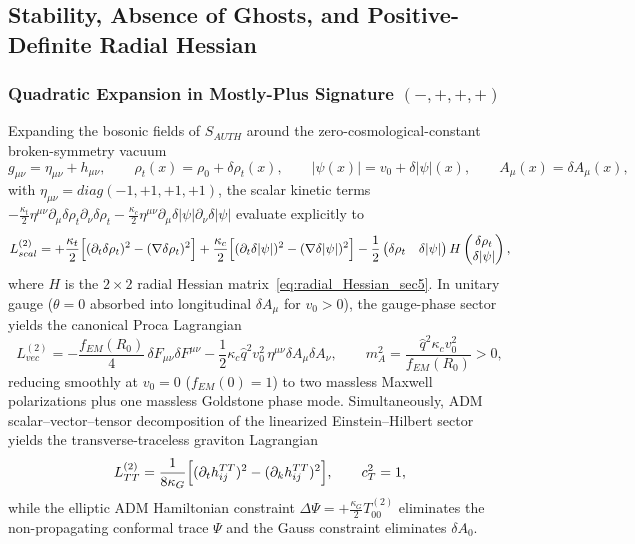 \documentclass[american,11pt,letterpaper]{article}
\def\mathcal#1{#1}%
\def\mathrm#1{#1}%
\begin{document}
\subsection{Stability, Absence of Ghosts, and Positive-Definite Radial Hessian}

\subsubsection{Quadratic Expansion in Mostly-Plus Signature $(-,+,+,+)$}

Expanding the bosonic fields of $S_{\mathrm{AUTH}}$ around the zero-cosmological-constant broken-symmetry vacuum
\[
g_{\mu\nu} = \eta_{\mu\nu} + h_{\mu\nu}, \qquad
\rho_t(x) = \rho_0 + \delta\rho_t(x), \qquad
|\psi(x)| = v_0 + \delta|\psi|(x), \qquad
A_\mu(x) = \delta A_\mu(x),
\]
with $\eta_{\mu\nu} = \mathrm{diag}(-1,+1,+1,+1)$, the scalar kinetic terms $-\frac{\kappa_t}{2}\eta^{\mu\nu}\partial_\mu\delta\rho_t\partial_\nu\delta\rho_t - \frac{\kappa_c}{2}\eta^{\mu\nu}\partial_\mu\delta|\psi|\partial_\nu\delta|\psi|$ evaluate explicitly to
\begin{equation}
\mathcal{L}_{\mathrm{scal}}^{(2)}
= +\frac{\kappa_t}{2}\Bigl[(\partial_t\delta\rho_t)^2 - (\nabla\delta\rho_t)^2\Bigr]
  + \frac{\kappa_c}{2}\Bigl[(\partial_t\delta|\psi|)^2 - (\nabla\delta|\psi|)^2\Bigr]
  - \frac{1}{2}
  \begin{pmatrix}\delta\rho_t & \delta|\psi|\end{pmatrix}
  H
  \begin{pmatrix}\delta\rho_t \\ \delta|\psi|\end{pmatrix},
\label{eq:quadratic_scalar_lagrangian_sec19}
\end{equation}
where $H$ is the $2\times 2$ radial Hessian matrix~\eqref{eq:radial_Hessian_sec5}. In unitary gauge ($\theta = 0$ absorbed into longitudinal $\delta A_\mu$ for $v_0 > 0$), the gauge-phase sector yields the canonical Proca Lagrangian
\begin{equation}
\mathcal{L}_{\mathrm{vec}}^{(2)}
= -\frac{f_{\mathrm{EM}}(R_0)}{4}\,\delta F_{\mu\nu}\delta F^{\mu\nu}
  - \frac{1}{2}\kappa_c\hat{q}^2 v_0^2\,\eta^{\mu\nu}\delta A_\mu\delta A_\nu,
\qquad
m_A^2 = \frac{\hat{q}^2\kappa_c v_0^2}{f_{\mathrm{EM}}(R_0)} > 0,
\label{eq:proca_mass_sec19}
\end{equation}
reducing smoothly at $v_0 = 0$ ($f_{\mathrm{EM}}(0)=1$) to two massless Maxwell polarizations plus one massless Goldstone phase mode. Simultaneously, ADM scalar--vector--tensor decomposition of the linearized Einstein--Hilbert sector yields the transverse-traceless graviton Lagrangian
\begin{equation}
\mathcal{L}_{\mathrm{TT}}^{(2)}
= \frac{1}{8\kappa_G}\Bigl[(\partial_t h_{ij}^{\mathrm{TT}})^2 - (\partial_k h_{ij}^{\mathrm{TT}})^2\Bigr],
\qquad
c_T^2 = 1,
\label{eq:graviton_TT_sec19}
\end{equation}
while the elliptic ADM Hamiltonian constraint $\Delta\Psi = +\frac{\kappa_G}{2}T_{00}^{(2)}$ eliminates the non-propagating conformal trace $\Psi$ and the Gauss constraint eliminates $\delta A_0$.
\end{document}
